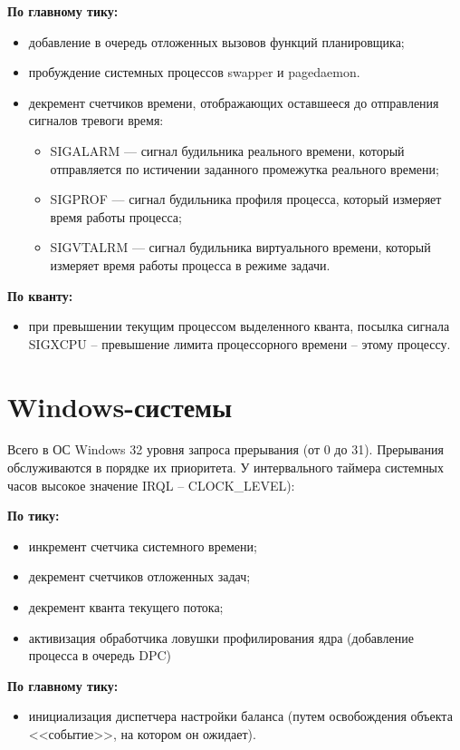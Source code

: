 \textbf{По главному тику:}
\begin{itemize}
	\item добавление в очередь отложенных вызовов функций планировщика;
	\item пробуждение системных процессов {\ttfamily swapper} и {\ttfamily pagedaemon}.
	\item декремент счетчиков времени, отображающих оставшееся до отправления сигналов тревоги время:
	\begin{itemize}
		\item {\ttfamily SIGALARM} --- сигнал будильника реального времени, который отправляется по истичении заданного промежутка реального времени;
		\item {\ttfamily SIGPROF} --- сигнал будильника профиля процесса, который измеряет время работы процесса;
		\item {\ttfamily SIGVTALRM} --- сигнал будильника виртуального времени, который измеряет время работы процесса в режиме задачи.
	\end{itemize}
\end{itemize}

\textbf{По кванту:}
\begin{itemize}
	\item при превышении текущим процессом выделенного кванта, посылка сигнала {\ttfamily SIGXCPU} -- превышение лимита процессорного времени -- этому процессу.
\end{itemize}

\section{Windows-системы}

Всего в ОС Windows 32 уровня запроса прерывания (от 0 до 31). Прерывания обслуживаются в порядке их приоритета. У интервального таймера системных часов высокое значение {\ttfamily IRQL} – {\ttfamily CLOCK\_LEVEL}):

\textbf{По тику:}
\begin{itemize}
	\item инкремент счетчика системного времени;
	\item декремент счетчиков отложенных задач;
	\item декремент кванта текущего потока;
	\item активизация обработчика ловушки профилирования ядра (добавление процесса в очередь {\ttfamily DPC})
\end{itemize}

\textbf{По главному тику:}
\begin{itemize}
	\item инициализация диспетчера настройки баланса (путем освобождения объекта <<событие>>, на котором он ожидает).
\end{itemize}

